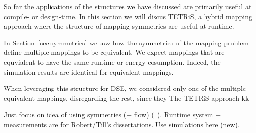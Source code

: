 So far the applications of the structures we have discussed are primarily useful at compile- or design-time.
In this section we will discus \acs{TETRiS}, a hybrid mapping approach where the structure of mapping symmetries are useful at runtime.

In Section~\ref{sec:symmetries} we saw how the symmetries of the mapping problem define multiple mappings to be equivalent.
We expect mappings that are equvialent to have the same runtime or energy cosumption. Indeed, the simulation results are identical for equivalent mappings.

When leveraging this structure for \ac{DSE}, we considered only one of the multiple equivalent mappings, disregarding the rest, since they 
The \acf{TETRiS} approach kk

Just focus on idea of using symmetries (+ flow) (~\cite{goens_scopes17}). Runtime system + measurements are for Robert/Till's dissertations.
Use simulations here (new).